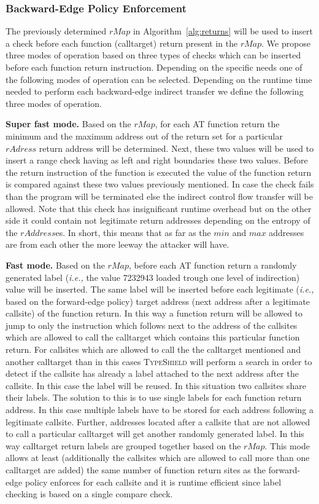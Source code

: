 \subsubsection{Backward-Edge Policy Enforcement}
The previously determined $rMap$ in Algorithm~\ref{alg:returns} will be used to insert a check before each 
function (calltarget) return present in the $rMap$. We propose three modes of operation based on three types
of checks which can be inserted before each function return instruction. Depending on the specific needs
one of the following modes of operation can be selected. Depending on the runtime time needed to perform each backward-edge
indirect transfer we define the following three modes of operation.

\textbf{Super fast mode.} Based on the $rMap$, for each AT function return the minimum and the maximum address out of the return set for a particular 
$rAdress$ return address will be determined. Next, these two values will be used to insert a range check having as left and right boundaries these
two values. Before the return instruction of the function is executed the value of the function return is compared against these two values previously
mentioned. In case the check fails than the program will be terminated else the indirect control flow transfer will be allowed.
Note that this check has insignificant runtime overhead but on the other side it could contain not legitimate return addresses depending 
on the entropy of the $rAddress$es. In short, this means that as far as the $min$ and $max$ addresses are from each other the more leeway the attacker will have. 

\textbf{Fast mode.} Based on the $rMap$, before each AT function return a randomly generated label (\textit{i.e.,} the value 7232943 loaded trough one level of indirection) 
value will be inserted. The same label will be inserted before each legitimate (\textit{i.e.,} based on the forward-edge policy) target address (next address after a legitimate callsite) of the function return. 
In this way a function return will be allowed to jump to only the instruction which follows next to the 
address of the callsites which are allowed to call the calltarget which contains this particular function return. 
For callsites which are allowed to call the the calltarget mentioned and another calltarget than in this cases \textsc{TypeShield} will perform a search in order to detect if the callsite
has already a label attached to the next address after the callsite. In this case the label will be reused. In this situation two callsites share their labels. The solution to this is to 
use single labels for each function return address. In this case multiple labels have to be stored for each address following a legitimate callsite.
Further, addresses located after a callsite that are not allowed to call a particular calltarget will get another randomly generated label. 
In this way calltarget return labels are grouped together based on the $rMap$. This mode allows 
at least (additionally the callsites which are allowed to call more than one calltarget are added) the same number of function return sites as the 
forward-edge policy enforces for each callsite and it is runtime efficient since label checking is based on a single compare check.

